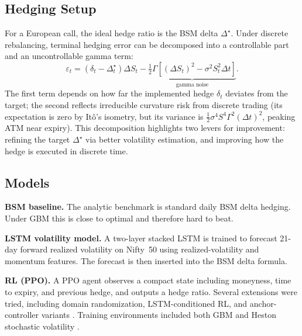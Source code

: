 \documentclass[10pt,a4paper]{article}
\begin{document}
\subsection*{Hedging Setup}
For a European call, the ideal hedge ratio is the BSM delta $\Delta^\star$.
Under discrete rebalancing, terminal hedging error can be decomposed into a
controllable part and an uncontrollable gamma term:
\[
  \varepsilon_t = (\delta_t - \Delta_t^\star)\Delta S_t
                 - \underbrace{\tfrac12\Gamma[(\Delta S_t)^2-\sigma^2 S_t^2\Delta t]}_{\text{gamma noise}}.
\]
The first term depends on how far the implemented hedge $\delta_t$ deviates
from the target; the second reflects irreducible curvature risk from discrete
trading (its expectation is zero by It\^{o}'s isometry, but its variance is
$\tfrac12\sigma^4 S^4\Gamma^2(\Delta t)^2$, peaking ATM near expiry).
This decomposition highlights two levers for improvement: refining the target
$\Delta^\star$ via better volatility estimation, and improving how the hedge
is executed in discrete time.

\subsection*{Models}
\textbf{BSM baseline.} The analytic benchmark is standard daily BSM delta
hedging. Under GBM this is close to optimal and therefore hard to beat.

\textbf{LSTM volatility model.} A two-layer stacked LSTM \cite{Hochreiter1997} is trained to forecast
21-day forward realized volatility on Nifty~50 using realized-volatility and
momentum features. The forecast is then inserted into the BSM delta formula.

\textbf{RL (PPO).} A PPO agent \cite{Schulman2017} observes a compact state including moneyness,
time to expiry, and previous hedge, and outputs a hedge ratio. Several
extensions were tried, including domain randomization, LSTM-conditioned RL, and
anchor-controller variants \cite{Buehler2019}.  Training environments included
both GBM and Heston stochastic volatility \cite{Heston1993}.
\end{document}
